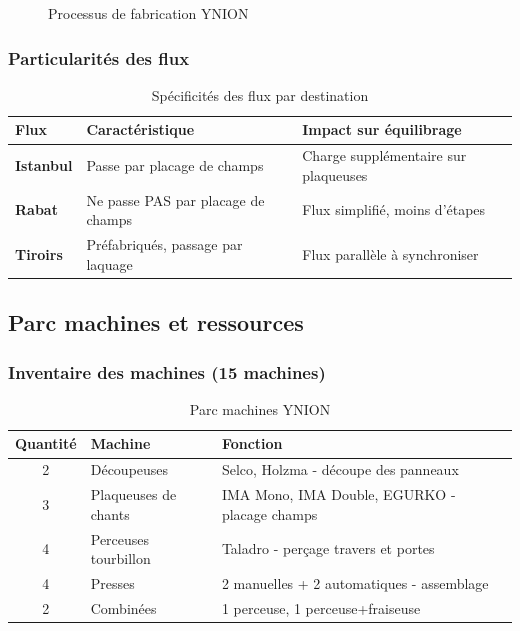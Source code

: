 \documentclass[12pt,a4paper]{article}
\begin{document}
\begin{center}
\begin{figure}[H]
\caption{Processus de fabrication YNION}
\label{fig:ynion_process}
\end{figure}

\subsubsection{Particularités des flux}

\begin{table}[H]
\centering
\caption{Spécificités des flux par destination}
\label{tab:ynion_flux}
\begin{tabular}{|p{3cm}|p{5cm}|p{5cm}|}
\hline
\textbf{Flux} & \textbf{Caractéristique} & \textbf{Impact sur équilibrage} \\ \hline
\textbf{Istanbul} & Passe par placage de champs & Charge supplémentaire sur plaqueuses \\ \hline
\textbf{Rabat} & Ne passe PAS par placage de champs & Flux simplifié, moins d'étapes \\ \hline
\textbf{Tiroirs} & Préfabriqués, passage par laquage & Flux parallèle à synchroniser \\ \hline
\end{tabular}
\end{table}

\subsection{Parc machines et ressources}

\subsubsection{Inventaire des machines (15 machines)}

\begin{table}[H]
\centering
\caption{Parc machines YNION}
\label{tab:ynion_machines}
\begin{tabular}{|c|l|l|}
\hline
\textbf{Quantité} & \textbf{Machine} & \textbf{Fonction} \\ \hline
2 & Découpeuses & Selco, Holzma - découpe des panneaux \\ \hline
3 & Plaqueuses de chants & IMA Mono, IMA Double, EGURKO - placage champs \\ \hline
4 & Perceuses tourbillon & Taladro - perçage travers et portes \\ \hline
4 & Presses & 2 manuelles + 2 automatiques - assemblage \\ \hline
2 & Combinées & 1 perceuse, 1 perceuse+fraiseuse \\ \hline
\end{tabular}
\end{table}


\end{center}
\end{document}
